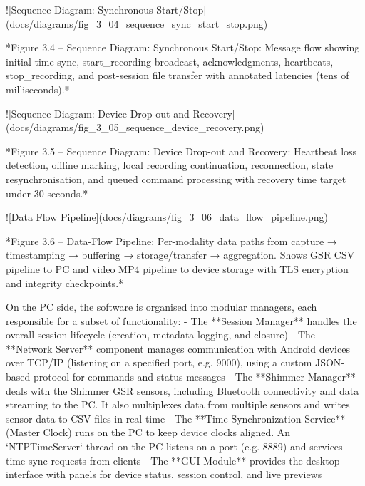 \documentclass[12pt,a4paper]{article}
\begin{document}
![Sequence Diagram: Synchronous Start/Stop](docs/diagrams/fig_3_04_sequence_sync_start_stop.png)

*Figure 3.4 – Sequence Diagram: Synchronous Start/Stop: Message flow showing initial time sync, start_recording broadcast, acknowledgments, heartbeats, stop_recording, and post-session file transfer with annotated latencies (tens of milliseconds).*

![Sequence Diagram: Device Drop-out and Recovery](docs/diagrams/fig_3_05_sequence_device_recovery.png)

*Figure 3.5 – Sequence Diagram: Device Drop-out and Recovery: Heartbeat loss detection, offline marking, local recording continuation, reconnection, state resynchronisation, and queued command processing with recovery time target under 30 seconds.*

![Data Flow Pipeline](docs/diagrams/fig_3_06_data_flow_pipeline.png)

*Figure 3.6 – Data-Flow Pipeline: Per-modality data paths from capture → timestamping → buffering → storage/transfer → aggregation. Shows GSR CSV pipeline to PC and video MP4 pipeline to device storage with TLS encryption and integrity checkpoints.*

On the PC side, the software is organised into modular managers, each responsible for a subset of functionality: 
- The **Session Manager** handles the overall session lifecycle (creation, metadata logging, and closure)
- The **Network Server** component manages communication with Android devices over TCP/IP (listening on a specified port, e.g. 9000), using a custom JSON-based protocol for commands and status messages
- The **Shimmer Manager** deals with the Shimmer GSR sensors, including Bluetooth connectivity and data streaming to the PC. It also multiplexes data from multiple sensors and writes sensor data to CSV files in real-time
- The **Time Synchronization Service** (Master Clock) runs on the PC to keep device clocks aligned. An `NTPTimeServer` thread on the PC listens on a port (e.g. 8889) and services time-sync requests from clients
- The **GUI Module** provides the desktop interface with panels for device status, session control, and live previews
\end{document}

